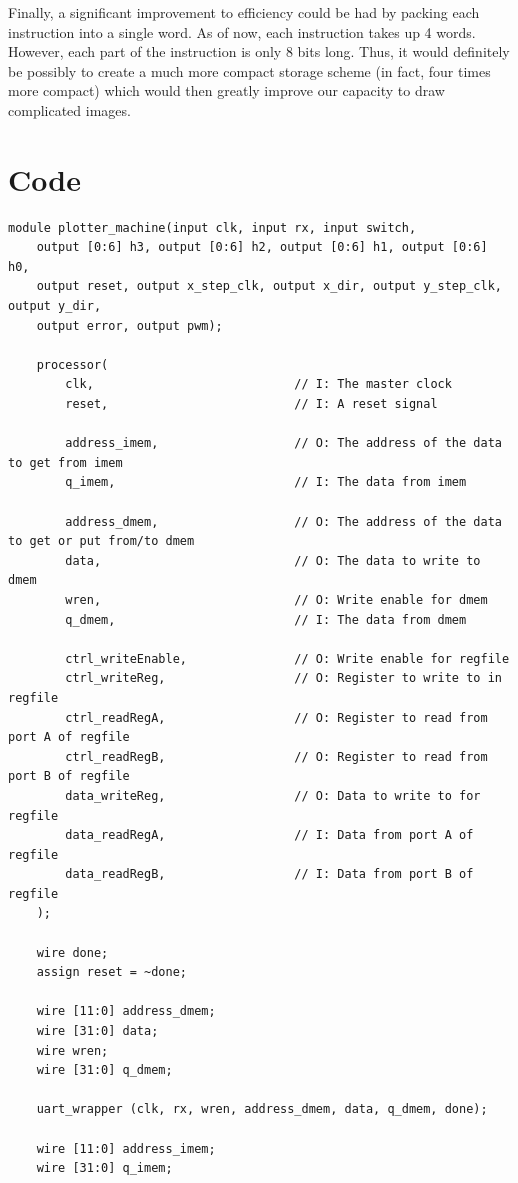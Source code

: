 \documentclass[12pt]{article}
\begin{document}
Finally, a significant improvement to efficiency could be had by packing each instruction into a single word. As of now, each instruction takes up 4 words. However, each part of the instruction is only 8 bits long. Thus, it would definitely be possibly to create a much more compact storage scheme (in fact, four times more compact) which would then greatly improve our capacity to draw complicated images. 

\newpage
\section{Code}
\begin{lstlisting}[style=myVerilog, caption={The Top Level Module}]
module plotter_machine(input clk, input rx, input switch,
	output [0:6] h3, output [0:6] h2, output [0:6] h1, output [0:6] h0, 
	output reset, output x_step_clk, output x_dir, output y_step_clk, output y_dir, 
	output error, output pwm);

	processor(
	    clk,                            // I: The master clock
	    reset,                          // I: A reset signal
	    
	    address_imem,                   // O: The address of the data to get from imem
	    q_imem,                         // I: The data from imem
	
	    address_dmem,                   // O: The address of the data to get or put from/to dmem
	    data,                           // O: The data to write to dmem
	    wren,                           // O: Write enable for dmem
	    q_dmem,                         // I: The data from dmem
	
	    ctrl_writeEnable,               // O: Write enable for regfile
	    ctrl_writeReg,                  // O: Register to write to in regfile
	    ctrl_readRegA,                  // O: Register to read from port A of regfile
	    ctrl_readRegB,                  // O: Register to read from port B of regfile
	    data_writeReg,                  // O: Data to write to for regfile
	    data_readRegA,                  // I: Data from port A of regfile
	    data_readRegB,                  // I: Data from port B of regfile
	);
	
	wire done;
	assign reset = ~done;
	
	wire [11:0] address_dmem;
	wire [31:0] data;
	wire wren;
	wire [31:0] q_dmem;
	
	uart_wrapper (clk, rx, wren, address_dmem, data, q_dmem, done);
	
	wire [11:0] address_imem;
	wire [31:0] q_imem;
	

\end{lstlisting}
\end{document}
